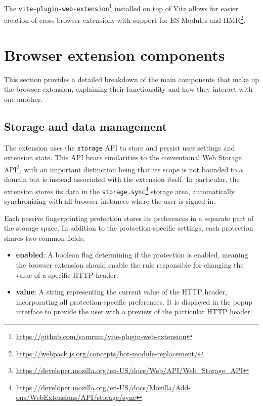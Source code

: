 The \texttt{vite-plugin-web-extension}\footnote{\url{https://github.com/samrum/vite-plugin-web-extension}} installed on top of Vite allows for easier creation of cross-browser extensions with support for ES Modules and HMR\footnote{\url{https://webpack.js.org/concepts/hot-module-replacement/}}.

\section{Browser extension components}

This section provides a detailed breakdown of the main components that make up the browser extension, explaining their functionality and how they interact with one another.

\subsection{Storage and data management}

The extension uses the \texttt{storage} API to store and persist user settings and extension state. This API bears similarities to the conventional Web Storage API\footnote{\url{https://developer.mozilla.org/en-US/docs/Web/API/Web_Storage_API}}, with an important distinction being that its scope is not bounded to a domain but is instead associated with the extension itself. In particular, the extension stores its data in the \texttt{storage.sync}\footnote{\url{https://developer.mozilla.org/en-US/docs/Mozilla/Add-ons/WebExtensions/API/storage/sync}} storage area, automatically synchronizing with all browser instances where the user is signed in.

Each passive fingerprinting protection stores its preferences in a separate part of the storage space. In addition to the protection-specific settings, each protection shares two common fields:

\begin{itemize}
	\item \textbf{enabled}: A boolean flag determining if the protection is enabled, meaning the browser extension should enable the rule responsible for changing the value of a specific HTTP header.
	\item \textbf{value}: A string representing the current value of the HTTP header, incorporating all protection-specific preferences. It is displayed in the popup interface to provide the user with a preview of the particular HTTP header.
\end{itemize}

